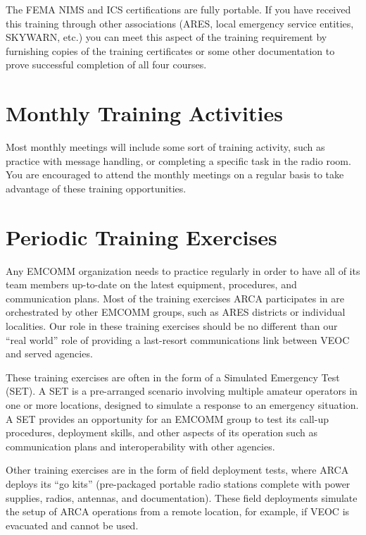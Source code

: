 \documentclass[pdflatex,letterpaper,twoside,12pt]{book}
\begin{document}
The FEMA NIMS and ICS certifications are fully portable.  If you have received this training through other associations (ARES, local emergency service entities, SKYWARN, etc.) you can meet this aspect of the training requirement by furnishing copies of the training certificates or some other documentation to prove successful completion of all four courses.


\section{Monthly Training Activities}

Most monthly meetings will include some sort of training activity, such as practice with message handling, or completing a specific task in the radio room.  You are encouraged to attend the monthly meetings on a regular basis to take advantage of these training opportunities.


\section{Periodic Training Exercises}

Any EMCOMM organization needs to practice regularly in order to have all of its team members up-to-date on the latest equipment, procedures, and communication plans.  Most of the training exercises ARCA participates in are orchestrated by other EMCOMM groups, such as ARES districts or individual localities.  Our role in these training exercises should be no different than our ``real world'' role of providing a last-resort communications link between VEOC and served agencies.

These training exercises are often in the form of a Simulated Emergency Test (SET).  A SET is a pre-arranged scenario involving multiple amateur operators in one or more locations, designed to simulate a response to an emergency situation.  A SET provides an opportunity for an EMCOMM group to test its call-up procedures, deployment skills, and other aspects of its operation such as communication plans and interoperability with other agencies.

Other training exercises are in the form of field deployment tests, where ARCA deploys its ``go kits'' (pre-packaged portable radio stations complete with power supplies, radios, antennas, and documentation).  These field deployments simulate the setup of ARCA operations from a remote location, for example, if VEOC is evacuated and cannot be used.
\end{document}
